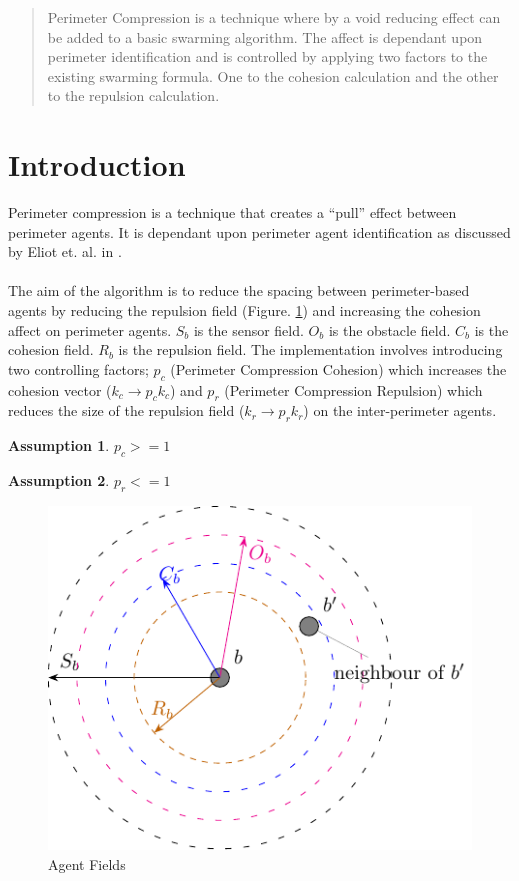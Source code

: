 \documentclass[12pt,a4paper]{article}
\newtheorem{assumption}{Assumption}
\begin{document}
\maketitle

\begin{abstract}
Perimeter Compression is a technique where by a void reducing effect can be added to a basic swarming algorithm. The affect is dependant upon perimeter identification and is controlled by applying two factors to the existing swarming formula. One to the cohesion calculation and the other to the repulsion calculation.
\end{abstract}

\section{Introduction}
Perimeter compression is a technique that creates a ``pull'' effect between perimeter agents. It is dependant upon perimeter agent identification as discussed by Eliot et. al. in \cite{eliot2017methods, eliot2018metric, eliot2019void}.
\paragraph{}
The aim of the algorithm is to reduce the spacing between perimeter-based agents by reducing the repulsion field (Figure. \ref{fig:stableswarm}) and increasing the cohesion affect on perimeter agents. $S_b$ is the sensor field. $O_b$ is the obstacle field. $C_b$ is the cohesion field. $R_b$ is the repulsion field. The implementation involves introducing two controlling factors; $p_c$ (Perimeter Compression Cohesion) which increases the cohesion vector ($k_c\rightarrow p_ck_c$) and $p_r$ (Perimeter Compression Repulsion) which reduces the size of the repulsion field ($k_r\rightarrow p_rk_r$) on the inter-perimeter agents.
\begin{assumption}
	$p_c >= 1$
\end{assumption}
\begin{assumption}
	$p_r <= 1$
\end{assumption}
\begin{figure}[H]
	\centering
	\includegraphics[width=0.4\linewidth]{figures/stableswarm}
	\caption[Agent Fields]{Agent Fields}
	\label{fig:stableswarm}
\end{figure}
\end{document}
